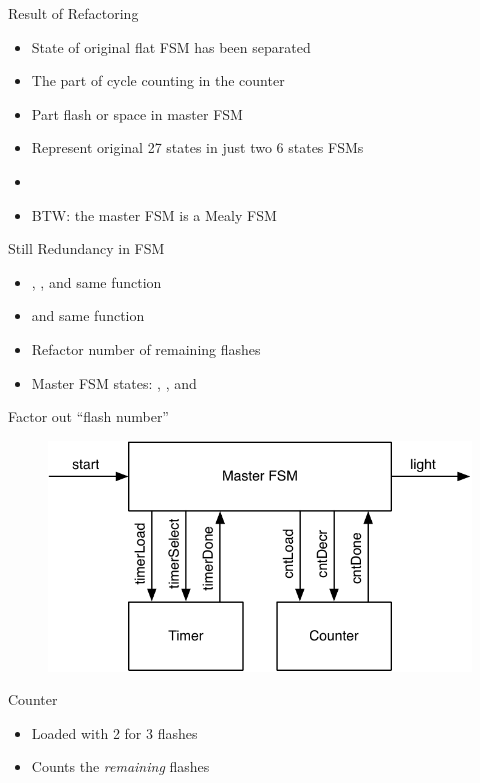 \begin{frame}[fragile]{Result of Refactoring}
\begin{itemize}
\item State of original flat FSM has been separated
\item The part of cycle counting in the counter
\item Part flash or space in master FSM
\item Represent original 27 states in just two 6 states FSMs
\item 
\item BTW: the master FSM is a Mealy FSM
\end{itemize}
\end{frame}

\begin{frame}[fragile]{Still Redundancy in FSM}
\begin{itemize}
\item {}, , and  same function
\item {} and  same function
\item Refactor number of remaining flashes
\item Master FSM states: , ,
and 
\end{itemize}
\end{frame}

\begin{frame}[fragile]{Factor out ``flash number''}
\begin{figure}
  \includegraphics[scale=\scale]{../figures/flasher2}
\end{figure}
\end{frame}

\begin{frame}[fragile]{Counter}
\begin{itemize}
\item Loaded with 2 for 3 flashes
\item Counts the \emph{remaining} flashes
\end{itemize}
\end{frame}

